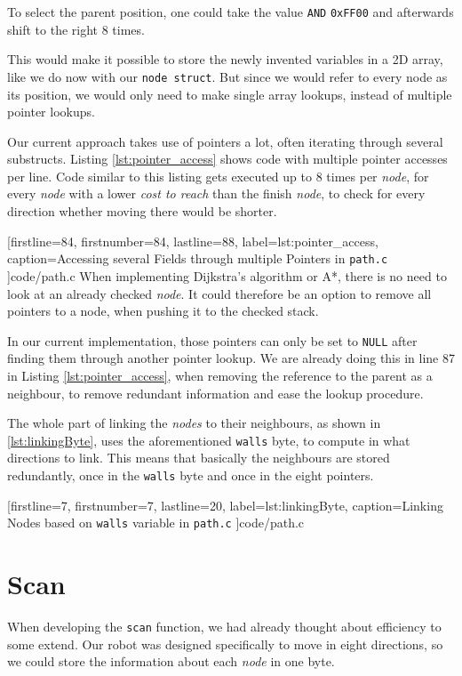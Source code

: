 To select the parent position,
one could take the value {\tt AND} {\tt 0xFF00} and
afterwards shift to the right 8 times.

This would make it possible to store the newly invented variables in a 2D array,
like we do now with our {\tt node struct}.
But since we would refer to every node as its position,
we would only need to make single array lookups,
instead of multiple pointer lookups.

Our current approach takes use of pointers a lot,
often iterating through several substructs.
Listing \ref{lst:pointer_access} shows code with multiple pointer accesses per line.
Code similar to this listing gets executed up to 8 times per \emph{node},
for every \emph{node} with a lower \emph{cost to reach} than the finish \emph{node},
to check for every direction whether moving there would be shorter.


[firstline=84,				%
firstnumber=84,
lastline=88,
label=lst:pointer_access,	%
caption={Accessing several Fields through multiple Pointers in {\tt path.c}}
]{code/path.c}
%
When implementing Dijkstra's algorithm or A*,
there is no need to look at an already checked \emph{node}.
It could therefore be an option to remove all pointers to a node,
when pushing it to the checked stack.

In our current implementation,
those pointers can only be set to {\tt NULL} after finding them through another pointer lookup.
We are already doing this in line 87 in Listing \ref{lst:pointer_access},
when removing the reference to the parent as a neighbour,
to remove redundant information and ease the lookup procedure.

The whole part of linking the \emph{nodes} to their neighbours,
as shown in \ref{lst:linkingByte},
uses the aforementioned {\tt walls} byte,
to compute in what directions to link.
This means that basically the neighbours are stored redundantly,
once in the {\tt walls} byte and once in the eight pointers.


[firstline=7,				%
firstnumber=7,
lastline=20,
label=lst:linkingByte,	%
caption={Linking Nodes based on {\tt walls} variable in {\tt path.c}}
]{code/path.c}
%

\section{Scan}
When developing the {\tt scan} function,
we had already thought about efficiency to some extend.
Our robot was designed specifically to move in eight directions,
so we could store the information about each \emph{node} in one byte.

